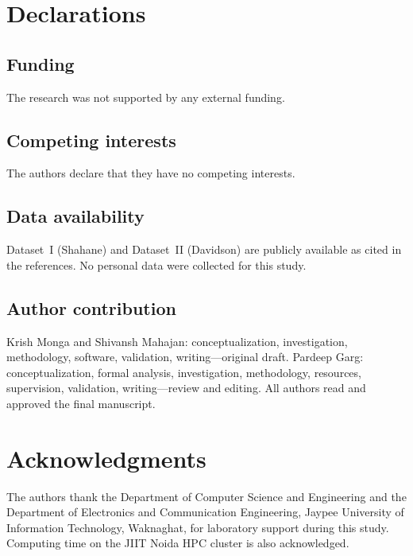 \documentclass[pdflatex,sn-mathphys-num]{sn-jnl}
\begin{document}


\section*{Declarations}

\subsection*{Funding}
The research was not supported by any external funding.

\subsection*{Competing interests}
The authors declare that they have no competing interests.

\subsection*{Data availability}
Dataset~I (Shahane) and Dataset~II (Davidson) are publicly available as cited in the references. No personal data were collected for this study.

\subsection*{Author contribution}
Krish Monga and Shivansh Mahajan: conceptualization, investigation, methodology, software, validation, writing---original draft. Pardeep Garg: conceptualization, formal analysis, investigation, methodology, resources, supervision, validation, writing---review and editing. All authors read and approved the final manuscript.

\section*{Acknowledgments}
The authors thank the Department of Computer Science and Engineering and the Department of Electronics and Communication Engineering, Jaypee University of Information Technology, Waknaghat, for laboratory support during this study. Computing time on the JIIT Noida HPC cluster is also acknowledged.


\end{document}
